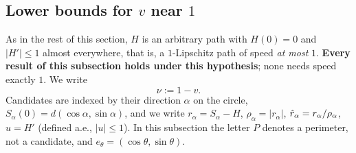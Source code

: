 
\subsection{Lower bounds for $v$ near $1$}\label{sec:G}

As in the rest of this section, $H$ is an arbitrary path with $H(0)=0$ and $|H'|\le1$ almost everywhere, that is, a
$1$-Lipschitz path of speed \emph{at most} $1$. \textbf{Every result of this subsection holds under this hypothesis}; none
needs speed exactly $1$. We write
\[
\nu:=1-v .
\]
Candidates are indexed by their direction $\alpha$ on the circle, $S_\alpha(0)=d(\cos\alpha,\sin\alpha)$, and we write
$r_\alpha=S_\alpha-H$, $\rho_\alpha=|r_\alpha|$, $\hat r_\alpha=r_\alpha/\rho_\alpha$, $u=H'$ (defined a.e., $|u|\le1$). In this subsection
the letter $P$ denotes a perimeter, not a candidate, and $e_\theta=(\cos\theta,\sin\theta)$.

